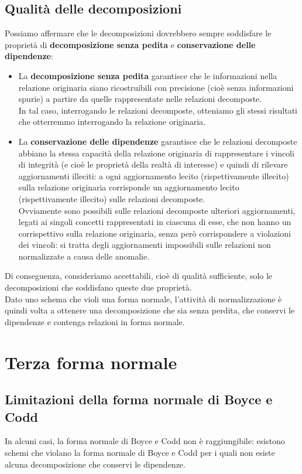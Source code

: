 \subsection{Qualità delle decomposizioni}
Possiamo affermare che le decomposizioni dovrebbero sempre soddisfare le proprietà di \textbf{decomposizione senza pedita} e \textbf{conservazione delle dipendenze}:
    \begin{itemize}
        \item{La \textbf{decomposizione senza pedita} garantisce che le informazioni nella relazione originaria siano ricostruibili con precisione (cioè senza informazioni spurie) a partire da quelle rappresentate nelle relazioni decomposte.\\
        In tal caso, interrogando le relazioni decomposte, otteniamo gli stessi risultati che otterremmo interrogando la relazione originaria.}
        \item{La \textbf{conservazione delle dipendenze} garantisce che le relazioni decomposte abbiano la stessa capacità della relazione originaria di rappresentare i vincoli di integrità (e cioè le proprietà della realtà di interesse) e quindi di rilevare aggiornamenti illeciti: a ogni aggiornamento lecito (rispettivamente illecito) sulla relazione originaria corrisponde un aggiornamento lecito (rispettivamente illecito) sulle relazioni decomposte.\\
        Ovviamente sono possibili sulle relazioni decomposte ulteriori aggiornamenti, legati ai singoli concetti rappresentati in ciascuna di esse, che non hanno un corrispettivo sulla relazione originaria, senza però corrispondere a violazioni dei vincoli: si tratta degli aggiornamenti impossibili sulle relazioni non normalizzate a causa delle anomalie.}
    \end{itemize}
Di conseguenza, consideriamo accettabili, cioè di qualità sufficiente, solo le decomposizioni che soddisfano queste due proprietà.\\
Dato uno schema che violi una forma normale, l'attività di normalizzazione è quindi volta a ottenere una decomposizione che sia senza perdita, che conservi le dipendenze e contenga relazioni in forma normale.

\section{Terza forma normale}
\subsection{Limitazioni della forma normale di Boyce e Codd}
In alcuni casi, la forma normale di Boyce e Codd non è raggiungibile: esistono schemi che violano la forma normale di Boyce e Codd per i quali non esiste alcuna decomposizione che conservi le dipendenze.

